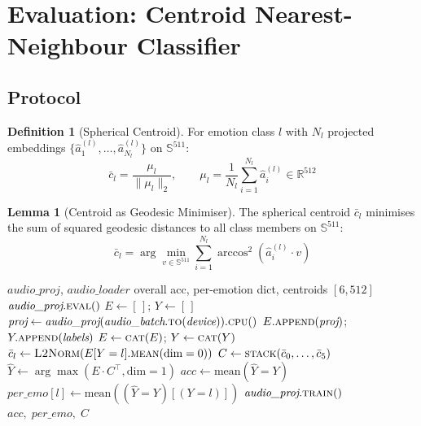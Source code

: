 \documentclass[12pt,a4paper]{article}
\theoremstyle{definition}
\newtheorem{lemma}[theorem]{Lemma}
\newtheorem{definition}[theorem]{Definition}
\theoremstyle{remark}
\begin{document}
\section{Evaluation: Centroid Nearest-Neighbour Classifier}

\subsection{Protocol}

\begin{definition}[Spherical Centroid]
For emotion class $l$ with $N_l$ projected embeddings
$\{\hat{a}_1^{(l)}, \ldots, \hat{a}_{N_l}^{(l)}\}$ on $\mathbb{S}^{511}$:
\[
  \bar{c}_l = \frac{\mu_l}{\|\mu_l\|_2}, \qquad
  \mu_l = \frac{1}{N_l}\sum_{i=1}^{N_l} \hat{a}_i^{(l)} \in \mathbb{R}^{512}
\]
\end{definition}

\begin{lemma}[Centroid as Geodesic Minimiser]
The spherical centroid $\bar{c}_l$ minimises the sum of squared
geodesic distances to all class members on $\mathbb{S}^{511}$:
\[
  \bar{c}_l = \arg\min_{v \in \mathbb{S}^{511}}
  \sum_{i=1}^{N_l} \arccos^2\!\left(\hat{a}_i^{(l)} \cdot v\right)
\]
\end{lemma}

\begin{algorithm}[H]
\caption{Centroid Nearest-Neighbour Evaluation}
\label{alg:eval}
\begin{algorithmic}[1]
\Require $\textit{audio\_proj}$, $\textit{audio\_loader}$
\Ensure overall acc, per-emotion dict, centroids $[6, 512]$
\State $\textit{audio\_proj}.\textsc{eval}()$
\State $E \gets [\,]$; $Y \gets [\,]$
  \State $\textit{proj} \gets \textit{audio\_proj}(\textit{audio\_batch}.\textsc{to}(\textit{device})).\textsc{cpu}()$
         \Comment{$[B, 512]$}
  \State $E.\textsc{append}(\textit{proj})$; $Y.\textsc{append}(\textit{labels})$
\EndFor
\State $E \gets \textsc{cat}(E)$; $Y \gets \textsc{cat}(Y)$ \Comment{$[N, 512]$, $[N]$}
  \State $\bar{c}_l \gets \textsc{L2Norm}(E[Y=l].\textsc{mean}(\text{dim}=0))$
\EndFor
\State $C \gets \textsc{stack}(\bar{c}_0, \ldots, \bar{c}_5)$ \Comment{$[6, 512]$}
\State $\hat{Y} \gets \arg\max(E \cdot C^\top, \text{dim}=1)$
\State $\textit{acc} \gets \text{mean}(\hat{Y} = Y)$
  \State $\textit{per\_emo}[l] \gets \text{mean}((\hat{Y} = Y)[(Y = l)])$
\EndFor
\State $\textit{audio\_proj}.\textsc{train}()$
\State \Return $\textit{acc},\; \textit{per\_emo},\; C$
\end{algorithmic}
\end{algorithm}
\end{document}
